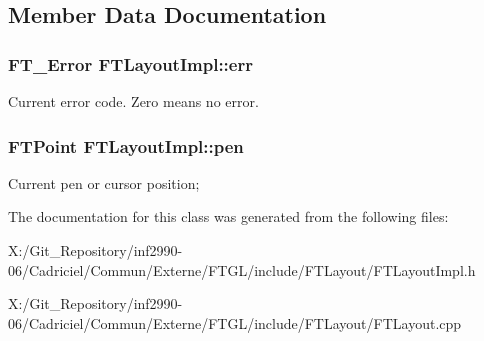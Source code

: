\subsection{Member Data Documentation}
\hypertarget{class_f_t_layout_impl_af3c9ad6d6636a69a6643d68383e4edcd}{
\subsubsection[{err}]{\setlength{\rightskip}{0pt plus 5cm}F\-T\-\_\-\-Error F\-T\-Layout\-Impl\-::err\hspace{0.3cm}{\ttfamily [protected]}}}\label{class_f_t_layout_impl_af3c9ad6d6636a69a6643d68383e4edcd}
Current error code. Zero means no error. \hypertarget{class_f_t_layout_impl_aefaff875c0cf4fe5710897f614be44ac}{
\subsubsection[{pen}]{\setlength{\rightskip}{0pt plus 5cm}F\-T\-Point F\-T\-Layout\-Impl\-::pen\hspace{0.3cm}{\ttfamily [protected]}}}\label{class_f_t_layout_impl_aefaff875c0cf4fe5710897f614be44ac}
Current pen or cursor position; 

The documentation for this class was generated from the following files\-:\begin{DoxyCompactItemize}
\item 
X\-:/\-Git\-\_\-\-Repository/inf2990-\/06/\-Cadriciel/\-Commun/\-Externe/\-F\-T\-G\-L/include/\-F\-T\-Layout/F\-T\-Layout\-Impl.\-h\item 
X\-:/\-Git\-\_\-\-Repository/inf2990-\/06/\-Cadriciel/\-Commun/\-Externe/\-F\-T\-G\-L/include/\-F\-T\-Layout/F\-T\-Layout.\-cpp\end{DoxyCompactItemize}
